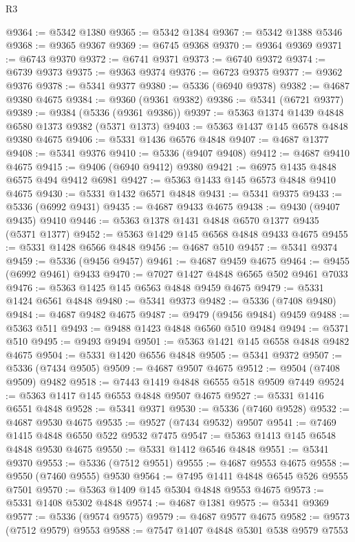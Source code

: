\begin{lexlean}{R3}
\begin{coremodule}
@9364 := @5342 @1380
@9365 := @5342 @1384
@9367 := @5342 @1388 @5346
@9368 := @9365 @9367
@9369 := @6745 @9368
@9370 := @9364 @9369
@9371 := @6743 @9370
@9372 := @6741 @9371
@9373 := @6740 @9372
@9374 := @6739 @9373
@9375 := @9363 @9374
@9376 := @6723 @9375
@9377 := @9362 @9376
@9378 := @5341 @9377
@9380 := @5336 (@6940 @9378)
@9382 := @4687 @9380 @4675
@9384 := @9360 (@9361 @9382)
@9386 := @5341 (@6721 @9377)
@9389 := @9384 (@5336 (@9361 @9386))
@9397 := @5363 @1374 @1439 @4848 @6580 @1373 @9382 (@5371 @1373)
@9403 := @5363 @1437 @145 @6578 @4848 @9380 @4675
@9406 := @5331 @1436 @6576 @4848
@9407 := @4687 @1377
@9408 := @5341 @9376
@9410 := @5336 (@9407 @9408)
@9412 := @4687 @9410 @4675
@9415 := @9406 (@6940 @9412) @9380
@9421 := @6975 @1435 @4848 @6575 @494 @9412 @6981
@9427 := @5363 @1433 @145 @6573 @4848 @9410 @4675
@9430 := @5331 @1432 @6571 @4848
@9431 := @5341 @9375
@9433 := @5336 (@6992 @9431)
@9435 := @4687 @9433 @4675
@9438 := @9430 (@9407 @9435) @9410
@9446 := @5363 @1378 @1431 @4848 @6570 @1377 @9435 (@5371 @1377)
@9452 := @5363 @1429 @145 @6568 @4848 @9433 @4675
@9455 := @5331 @1428 @6566 @4848
@9456 := @4687 @510
@9457 := @5341 @9374
@9459 := @5336 (@9456 @9457)
@9461 := @4687 @9459 @4675
@9464 := @9455 (@6992 @9461) @9433
@9470 := @7027 @1427 @4848 @6565 @502 @9461 @7033
@9476 := @5363 @1425 @145 @6563 @4848 @9459 @4675
@9479 := @5331 @1424 @6561 @4848
@9480 := @5341 @9373
@9482 := @5336 (@7408 @9480)
@9484 := @4687 @9482 @4675
@9487 := @9479 (@9456 @9484) @9459
@9488 := @5363 @511
@9493 := @9488 @1423 @4848 @6560 @510 @9484
@9494 := @5371 @510
@9495 := @9493 @9494
@9501 := @5363 @1421 @145 @6558 @4848 @9482 @4675
@9504 := @5331 @1420 @6556 @4848
@9505 := @5341 @9372
@9507 := @5336 (@7434 @9505)
@9509 := @4687 @9507 @4675
@9512 := @9504 (@7408 @9509) @9482
@9518 := @7443 @1419 @4848 @6555 @518 @9509 @7449
@9524 := @5363 @1417 @145 @6553 @4848 @9507 @4675
@9527 := @5331 @1416 @6551 @4848
@9528 := @5341 @9371
@9530 := @5336 (@7460 @9528)
@9532 := @4687 @9530 @4675
@9535 := @9527 (@7434 @9532) @9507
@9541 := @7469 @1415 @4848 @6550 @522 @9532 @7475
@9547 := @5363 @1413 @145 @6548 @4848 @9530 @4675
@9550 := @5331 @1412 @6546 @4848
@9551 := @5341 @9370
@9553 := @5336 (@7512 @9551)
@9555 := @4687 @9553 @4675
@9558 := @9550 (@7460 @9555) @9530
@9564 := @7495 @1411 @4848 @6545 @526 @9555 @7501
@9570 := @5363 @1409 @145 @5304 @4848 @9553 @4675
@9573 := @5331 @1408 @5302 @4848
@9574 := @4687 @1381
@9575 := @5341 @9369
@9577 := @5336 (@9574 @9575)
@9579 := @4687 @9577 @4675
@9582 := @9573 (@7512 @9579) @9553
@9588 := @7547 @1407 @4848 @5301 @538 @9579 @7553

\end{coremodule}
\end{lexlean}
